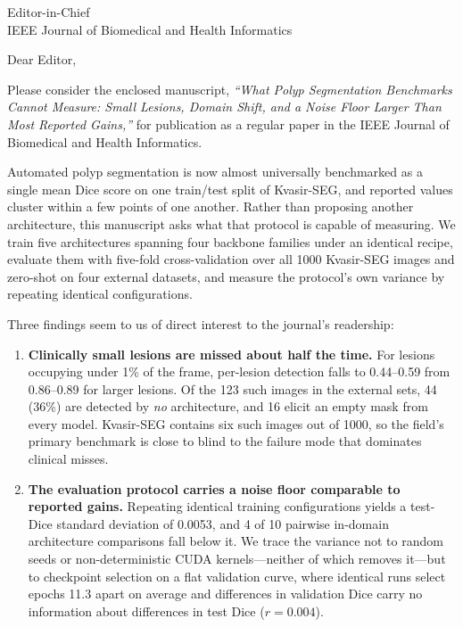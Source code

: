 \documentclass[11pt]{letter}
\begin{document}
\begin{letter}{Editor-in-Chief\\
IEEE Journal of Biomedical and Health Informatics}

\opening{Dear Editor,}

Please consider the enclosed manuscript, \emph{``What Polyp Segmentation
Benchmarks Cannot Measure: Small Lesions, Domain Shift, and a Noise Floor
Larger Than Most Reported Gains,''} for publication as a regular paper in the
IEEE Journal of Biomedical and Health Informatics.

Automated polyp segmentation is now almost universally benchmarked as a
single mean Dice score on one train/test split of Kvasir-SEG, and reported
values cluster within a few points of one another. Rather than proposing
another architecture, this manuscript asks what that protocol is capable of
measuring. We train five architectures spanning four backbone families under
an identical recipe, evaluate them with five-fold cross-validation over all
1000 Kvasir-SEG images and zero-shot on four external datasets, and measure
the protocol's own variance by repeating identical configurations.

Three findings seem to us of direct interest to the journal's readership:

\begin{enumerate}
\item \textbf{Clinically small lesions are missed about half the time.} For
lesions occupying under 1\% of the frame, per-lesion detection falls to
0.44--0.59 from 0.86--0.89 for larger lesions. Of the 123 such images in the
external sets, 44 (36\%) are detected by \emph{no} architecture, and 16 elicit
an empty mask from every model. Kvasir-SEG contains six such images out of
1000, so the field's primary benchmark is close to blind to the failure mode
that dominates clinical misses.

\item \textbf{The evaluation protocol carries a noise floor comparable to
reported gains.} Repeating identical training configurations yields a
test-Dice standard deviation of 0.0053, and 4 of 10 pairwise in-domain
architecture comparisons fall below it. We trace the variance not to random
seeds or non-deterministic CUDA kernels---neither of which removes it---but to
checkpoint selection on a flat validation curve, where identical runs select
epochs 11.3 apart on average and differences in validation Dice carry no
information about differences in test Dice ($r=0.004$).


\end{enumerate}
\end{letter}
\end{document}
